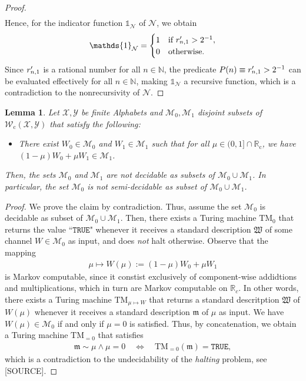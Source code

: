 \documentclass[conference]{IEEEtran}
\def\X{{\mathcal X}}
\def\Y{{\mathcal Y}}
\def\M{{\mathcal M}}
\def\N{{\mathcal N}}
\def\W{{\mathcal W}}
\def\NN{{\mathbb N}}
\def\RR{{\mathbb R}}
\newcommand{\RRc}{\RR_{\mathrm{c}}}
\newcommand{\TM}{\mathrm{TM}}
\newcommand{\rp}[1]{\mathrlap{\phantom{r}^{\prime}}r_{#1}}
\newcommand{\Wc}{\W_{\mathrm{c}}}
\newcommand{\sdummy}{{\color{red}[SOURCE]}}
\newtheorem{Lemma}[Theorem]{Lemma}
\begin{document}
\begin{proof}
\begin{align}
					\end{align}
					Hence, for the indicator function \(\mathds{1}_\N\) of \(\N\), we obtain
					\begin{align}	\mathds{1}_\N =		\begin{cases}	1	&\text{if}~\rp{n,1} > 2^{-1}, \\
																		0	&\text{otherwise}.
														\end{cases} 
					\end{align}
					Since \(\rp{n,1}\) is a rational number for all \(n\in\NN\), the predicate \(P(n) \equiv  \rp{n,1} > 2^{-1}\) can be
					evaluated effectively for all \(n\in\NN\), making \(\mathds{1}_\N\) a recursive function, which is a contradiction to the nonrecursivity of \(\N\).			
	\end{proof}
	\begin{Lemma}	Let \(\X,\Y\) be finite Alphabets and \(\M_0, \M_1\) disjoint subsets of \(\Wc(\X,\Y)\) that satisfy the following:
					\begin{itemize}	\item There exist \(W_0\in\M_0\) and \(W_1\in\M_1\) such that for all \(\mu \in (0,1]\cap \RRc\), 													
										we have \((1-\mu)W_0 + \mu W_1 \in \M_1\). 
					\end{itemize}
					Then, the sets \(\M_0\) and \(\M_1\) are \emph{not} decidable as subsets of \(\M_0 \cup \M_1\). In particular, the set 
					\(\M_0\) is \emph{not} semi-decidable as subset of \(\M_0 \cup \M_1\).
	\end{Lemma}\begin{proof}
					We prove the claim by contradiction. Thus, assume the set \(\M_0\) is decidable as subset of \(\M_0 \cup \M_1\). 
					Then, there exists a Turing machine \(\TM_0\) that returns the value ``\(\mathtt{TRUE}\)" whenever it receives a standard description
					\(\mathfrak{W}\) of some channel \(W\in \M_0\) as input, and does \emph{not} halt otherwise. Observe that the mapping
					\begin{align}	\mu \mapsto W(\mu) := (1-\mu)W_0 + \mu W_1
					\end{align} 
					is Markov computable, since it constist exclusively of component-wise addidtions and multiplications, which in turn are Markov computable on \(\RR_c\).
					In other words, there exists a Turing machine \(\TM_{\mu\mapsto W}\) that returns a standard descritption \(\mathfrak{W}\) of 
					\(W(\mu)\) whenever it receives a standard description \(\mathfrak{m}\) of \(\mu\) as input. We have \(W(\mu) \in \M_0\) if and only if
					\(\mu = 0\) is satisfied. Thus, by concatenation, we obtain a Turing machine
					\(\TM_{=0}\) that satisfies
					\begin{align}	\mathfrak{m} \sim \mu \wedge \mu = 0	\quad\Leftrightarrow\quad  \TM_{=0}(\mathfrak{m}) = \mathtt{TRUE},
					\end{align}
					which is a contradiction to the undecidability of the \emph{halting} problem, see \sdummy.
	\end{proof}
\end{document}
